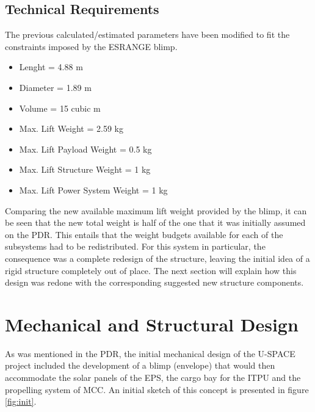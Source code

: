 \subsection{Technical Requirements}

The previous calculated/estimated parameters have been modified to fit the constraints imposed by the ESRANGE blimp. 

\begin{itemize}
\item Lenght = 4.88 m
\item Diameter = 1.89 m
\item Volume = 15 cubic m
\item Max. Lift Weight = 2.59 kg
\item Max. Lift Payload Weight = 0.5 kg
\item Max. Lift Structure Weight = 1 kg
\item Max. Lift Power System Weight = 1 kg


\end{itemize}

Comparing the new available maximum lift weight provided by the blimp, it can be seen that the new total weight is half of the one that it was initially assumed on the PDR. This entails that the weight budgets available for each of the subsystems had to be redistributed. For this system in particular, the consequence was a complete redesign of the structure, leaving the initial idea of a rigid structure completely out of place. The next section will explain how this design was redone with the corresponding suggested new structure components. 




\section{Mechanical and Structural Design}

As was mentioned in the \ac{PDR}, the initial mechanical design of the \ac{U-SPACE} project included the development of a blimp (envelope) that would then accommodate the solar panels of the \ac{EPS}, the cargo bay for the \ac{ITPU} and the propelling system of \ac{MCC}. An initial sketch of this concept is presented in figure \ref{fig:init}.  

